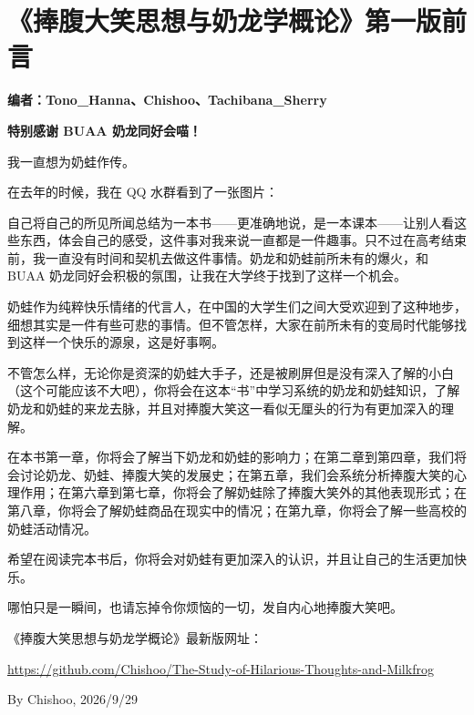 
\clearpage
\section*{《捧腹大笑思想与奶龙学概论》第一版前言}

\begin{center}
\textbf{编者：Tono\_Hanna、Chishoo、Tachibana\_Sherry}
\end{center}

\begin{center}
\textbf{特别感谢 BUAA 奶龙同好会喵！}
\end{center}

我一直想为奶蛙作传。

在去年的时候，我在 QQ 水群看到了一张图片：



自己将自己的所见所闻总结为一本书——更准确地说，是一本课本——让别人看这些东西，体会自己的感受，这件事对我来说一直都是一件趣事。只不过在高考结束前，我一直没有时间和契机去做这件事情。奶龙和奶蛙前所未有的爆火，和 BUAA 奶龙同好会积极的氛围，让我在大学终于找到了这样一个机会。

奶蛙作为纯粹快乐情绪的代言人，在中国的大学生们之间大受欢迎到了这种地步，细想其实是一件有些可悲的事情。但不管怎样，大家在前所未有的变局时代能够找到这样一个快乐的源泉，这是好事啊。

不管怎么样，无论你是资深的奶蛙大手子，还是被刷屏但是没有深入了解的小白（这个可能应该不大吧），你将会在这本“书”中学习系统的奶龙和奶蛙知识，了解奶龙和奶蛙的来龙去脉，并且对捧腹大笑这一看似无厘头的行为有更加深入的理解。

在本书第一章，你将会了解当下奶龙和奶蛙的影响力；在第二章到第四章，我们将会讨论奶龙、奶蛙、捧腹大笑的发展史；在第五章，我们会系统分析捧腹大笑的心理作用；在第六章到第七章，你将会了解奶蛙除了捧腹大笑外的其他表现形式；在第八章，你将会了解奶蛙商品在现实中的情况；在第九章，你将会了解一些高校的奶蛙活动情况。

希望在阅读完本书后，你将会对奶蛙有更加深入的认识，并且让自己的生活更加快乐。

哪怕只是一瞬间，也请忘掉令你烦恼的一切，发自内心地捧腹大笑吧。

《捧腹大笑思想与奶龙学概论》最新版网址：

\url{https://github.com/Chishoo/The-Study-of-Hilarious-Thoughts-and-Milkfrog}

\begin{flushright}
By Chishoo, 2026/9/29
\end{flushright}

